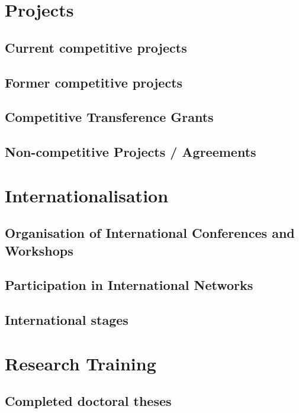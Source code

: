 \documentclass[english,a4paper,12pt,titlepage]{report}
\begin{document}
  \chapter{Projects}
  \section{Current competitive projects}
    
  \section{Former competitive projects}
    
  \section{Competitive Transference Grants}
      

  \section{Non-competitive Projects / Agreements}
    

  \chapter{Internationalisation}

  \section{Organisation of International Conferences and Workshops}
    
  \section{Participation in International Networks}
    
  \section{International stages}
       
     
  \chapter{Research Training}

  \section{Completed doctoral theses}
	
\end{document}
